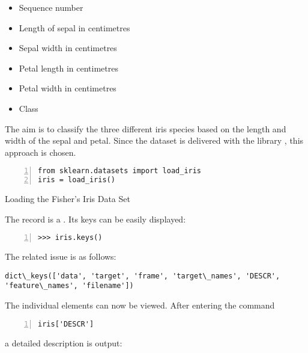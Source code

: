 \begin{itemize}
  \item Sequence number
  \item Length of sepal in centimetres
  \item Sepal width in centimetres
  \item Petal length in centimetres
  \item Petal width in centimetres
  \item Class    
\end{itemize}




The aim is to classify the three different iris species based on the length and width of the sepal and petal. Since the dataset is delivered with the library , this approach is chosen. 

\begin{code}
  \begin{lstlisting}[language=MyPython, numbers=left,label={src:irisimport}]
from sklearn.datasets import load_iris
iris = load_iris()
  \end{lstlisting}
  \caption{Loading the Fisher's Iris Data Set}
\end{code}


The record is a . Its keys can be easily displayed:

\begin{lstlisting}[language=MyPython, numbers=left]
>>> iris.keys()
\end{lstlisting}

The related issue is as follows:

\begin{lstlisting}[numbers=none]
    dict\_keys(['data', 'target', 'frame', 'target\_names', 'DESCR', 'feature\_names', 'filename'])
\end{lstlisting}



The individual elements can now be viewed. After entering the command 

\begin{lstlisting}[language=MyPython, numbers=left]
iris['DESCR']
\end{lstlisting}

a detailed description is output:

